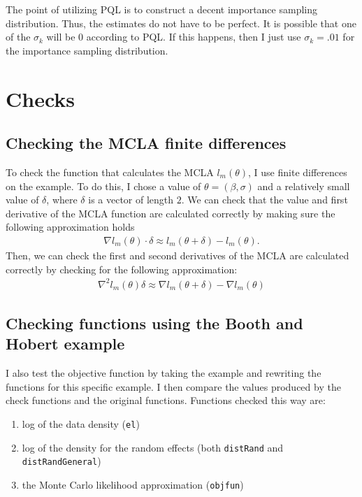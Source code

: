 \documentclass{article}
\begin{document}
The point of utilizing PQL is to construct a decent importance sampling distribution. Thus, the estimates do not have to be perfect.  It is possible that one of the $\sigma_k$ will be 0 according to PQL. If this happens, then I just use $\sigma_k = .01$ for the importance sampling distribution.








\section{Checks}
\subsection{Checking the MCLA finite differences}
To check the function that calculates the MCLA $l_m(\theta)$, I use finite differences on the \citet{booth:hobert:1999} example. To do this, I chose a value of $\theta=(\beta,\sigma)$ and a relatively small value of $\delta$, where $\delta$ is a vector of length $2$. We can check that the value and first derivative of the MCLA function are calculated correctly by making sure the following approximation holds
\begin{align}
\nabla l_m (\theta)  \cdot \delta \approx l_m(\theta+\delta)-l_m(\theta).
\end{align} 
Then, we can check the first and second derivatives of the MCLA are calculated correctly by checking for the following approximation:
\begin{align}
\nabla^2 l_m (\theta) \delta \approx \nabla l_m (\theta+\delta)-\nabla l_m (\theta)
\end{align}

\subsection{Checking  functions using the Booth and Hobert example}
I also test the objective function by taking the  \citet{booth:hobert:1999} example and rewriting the functions for this specific example. I then compare the values produced by the check functions and the original functions. Functions checked this way are:
\begin{enumerate}
\item log of the data density (\texttt{el})
\item log of the density for the random effects (both \texttt{distRand} and \texttt{distRandGeneral})
\item the Monte Carlo likelihood approximation (\texttt{objfun})
\end{enumerate}
\end{document}
